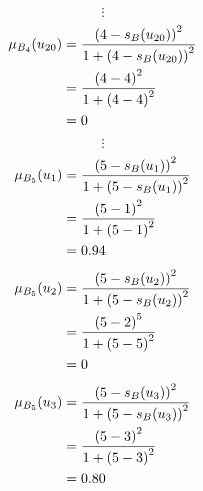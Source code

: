 \documentclass[a4paper]{book}
\begin{document}
				\[
					\vdots
				\]
				\begin{align}
					\mu_{B_4}(u_{20}) &= \frac{\left(4-s_B(u_{20})\right)^2}{1 + \left(4-s_B(u_{20})\right)^2}\\
					&= \frac{\left(4-4\right)^2}{1 + \left(4-4\right)^2} \notag \\
					&= 0 \notag
				\end{align}
				\[
					\vdots
				\]
				\begin{align}
					\mu_{B_5}(u_1) &= \frac{\left(5-s_B(u_1)\right)^2}{1 + \left(5-s_B(u_1)\right)^2}\\
					&= \frac{\left(5-1\right)^2}{1 + \left(5-1\right)^2} \notag \\
					&= 0.94 \notag
				\end{align}
				\begin{align}
					\mu_{B_5}(u_2) &= \frac{\left(5-s_B(u_2)\right)^2}{1 + \left(5-s_B(u_2)\right)^2}\\
					&= \frac{\left(5-2\right)^5}{1 + \left(5-5\right)^2} \notag \\
					&= 0 \notag
				\end{align}
				\begin{align}
					\mu_{B_5}(u_3) &= \frac{\left(5-s_B(u_3)\right)^2}{1 + \left(5-s_B(u_3)\right)^2}\\
					&= \frac{\left(5-3\right)^2}{1 + \left(5-3\right)^2} \notag \\
					&= 0.80 \notag
				\end{align}
\end{document}
